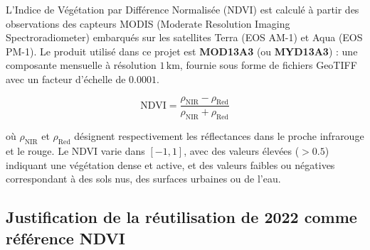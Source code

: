 \documentclass[12pt,a4paper]{report}
\begin{document}
L'Indice de Végétation par Différence Normalisée (NDVI) est calculé à partir des
observations des capteurs MODIS (Moderate Resolution Imaging Spectroradiometer) embarqués
sur les satellites Terra (EOS AM-1) et Aqua (EOS PM-1). Le produit utilisé dans ce projet
est \textbf{MOD13A3} (ou \textbf{MYD13A3}) : une composante mensuelle à résolution
$1\,\text{km}$, fournie sous forme de fichiers GeoTIFF avec un facteur d'échelle de
$0.0001$.

\begin{equation}
  \text{NDVI} = \frac{\rho_\text{NIR} - \rho_\text{Red}}{\rho_\text{NIR} + \rho_\text{Red}}
  \label{eq:ndvi}
\end{equation}

où $\rho_\text{NIR}$ et $\rho_\text{Red}$ désignent respectivement les réflectances dans
le proche infrarouge et le rouge. Le NDVI varie dans $[-1, 1]$, avec des valeurs élevées
($>0.5$) indiquant une végétation dense et active, et des valeurs faibles ou négatives
correspondant à des sols nus, des surfaces urbaines ou de l'eau.

\subsection{Justification de la réutilisation de 2022 comme référence NDVI}
\label{sec:ndvi-proxy}
\end{document}
